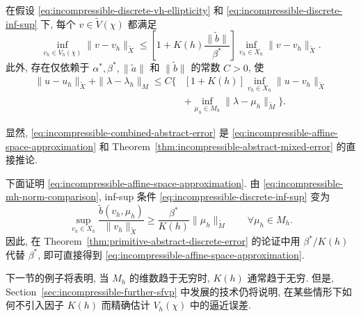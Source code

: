 \begin{Corollary}\label{cor:incompressible-abstract-mixed-quasioptimal}
在假设
\eqref{eq:incompressible-discrete-vh-ellipticity}
和 \eqref{eq:incompressible-discrete-inf-sup} 下,
每个 $v\in\widetilde V(\chi)$ 都满足
\begin{equation}\label{eq:incompressible-affine-space-approximation}
\inf_{v_h\in V_h(\chi)}
\|v-v_h\|_{\widetilde X}
\leq
\left[
1+K(h)\frac{\|\widetilde b\|}{\beta^*}
\right]
\inf_{v_h\in X_h}\|v-v_h\|_{\widetilde X}.
\end{equation}
此外, 存在仅依赖于
$\alpha^*,\beta^*,\|\widetilde a\|$ 和
$\|\widetilde b\|$ 的常数 $C>0$, 使
\begin{equation}\label{eq:incompressible-combined-abstract-error}
\begin{aligned}
\|u-u_h\|_{\widetilde X}
+\|\lambda-\lambda_h\|_M
\leq C\bigg\{&
[1+K(h)]
\inf_{v_h\in X_h}\|u-v_h\|_{\widetilde X}\\
&+\inf_{\mu_h\in M_h}
\|\lambda-\mu_h\|_{\widetilde M}
\bigg\}.
\end{aligned}
\end{equation}
\end{Corollary}

\begin{Proof}
显然,
\eqref{eq:incompressible-combined-abstract-error}
是 \eqref{eq:incompressible-affine-space-approximation}
和 Theorem~\ref{thm:incompressible-abstract-mixed-error}
的直接推论.

下面证明
\eqref{eq:incompressible-affine-space-approximation}.
由 \eqref{eq:incompressible-mh-norm-comparison},
inf-sup 条件
\eqref{eq:incompressible-discrete-inf-sup} 变为
\begin{equation}\label{eq:incompressible-scaled-discrete-inf-sup}
\sup_{v_h\in X_h}
\frac{\widetilde b(v_h,\mu_h)}
{\|v_h\|_{\widetilde X}}
\geq\frac{\beta^*}{K(h)}
\|\mu_h\|_{\widetilde M}
\qquad\forall\mu_h\in M_h.
\end{equation}
因此, 在
Theorem~\ref{thm:primitive-abstract-discrete-error}
的论证中用 $\beta^*/K(h)$ 代替 $\beta^*$,
即可直接得到
\eqref{eq:incompressible-affine-space-approximation}.
\end{Proof}

下一节的例子将表明, 当 $M_h$ 的维数趋于无穷时,
$K(h)$ 通常趋于无穷.
但是, Section~\ref{sec:incompressible-further-sfvp}
中发展的技术仍将说明, 在某些情形下如何不引入因子 $K(h)$
而精确估计 $V_h(\chi)$ 中的逼近误差.
